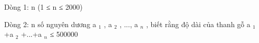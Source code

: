 Dòng 1: n (1 ≤ n ≤ 2000)

Dòng 2: n số nguyên dương a $_ 1 $ , a $_ 2 $ , ..., a $_ n $ , biết rằng độ dài của thanh gỗ a $_ 1 $ +a $_ 2 $ +...+a $_ n $ ≤ 500000

\